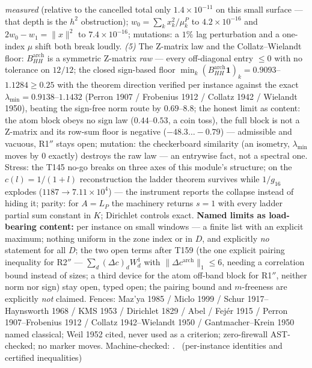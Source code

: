\emph{measured} (relative to the cancelled total only
$1.4\times10^{-11}$ on this small surface --- that depth is the $h^2$
obstruction); $w_0=\sum_kx_k^2/\mu^P_k$ to $4.2\times10^{-16}$ and
$2w_0-w_1=\|x\|^2$ to $7.4\times10^{-16}$; mutations: a $1\%$ lag
perturbation and a one-index $\mu$ shift both break loudly. \emph{(5)}
The Z-matrix law and the Collatz--Wielandt floor:
$B^{\mathrm{arch}}_{HH}$ is a symmetric Z-matrix \emph{raw} --- every
off-diagonal entry $\le0$ with no tolerance on $12/12$; the closed
sign-based floor $\min_k(B^{\mathrm{arch}}_{HH}\mathbf 1)_k=
0.9093$--$1.1284\ge0.25$ with the theorem direction verified per
instance against the exact $\lambda_{\min}=0.9138$--$1.1432$ (Perron
1907 / Frobenius 1912 / Collatz 1942 / Wielandt 1950), beating the
sign-free norm route by $0.69$--$8.8$; the honest limit as content: the
atom block obeys no sign law ($0.44$--$0.53$, a coin toss), the full
block is not a Z-matrix and its row-sum floor is negative
($-48.3\ldots-0.79$) --- admissible and vacuous, R1$''$ stays open;
mutation: the checkerboard similarity (an isometry, $\lambda_{\min}$
moves by $0$ exactly) destroys the raw law --- an entrywise fact, not a
spectral one. Stress: the T145 no-go breaks on three axes of this
module's structure; on the $c(l)=1/(1+l)$ reconstruction the ladder
theorem survives while $1/g_{16}$ explodes ($1187\to7.11\times10^{4}$)
--- the instrument reports the collapse instead of hiding it; parity:
for $A=L_P$ the machinery returns $s=1$ with every ladder partial sum
constant in $K$; Dirichlet controls exact.
\textbf{Named limits as load-bearing content:} per instance on small
windows --- a finite list with an explicit maximum; nothing uniform in
the zone index or in $D$, and explicitly \emph{no} statement for all
$D$; the two open terms after T159 (the one explicit pairing inequality
for R2$''$ --- $\sum_d(\Delta c)_dW^1_d$ with $\|\Delta c^{\mathrm{arch}}
\|_1\le6$, needing a correlation bound instead of sizes; a third device
for the atom off-band block for R1$''$, neither norm nor sign) stay
open, typed open; the pairing bound and $m$-freeness are explicitly
\emph{not} claimed. Fences: Maz'ya 1985 / Miclo 1999 / Schur
1917--Haynsworth 1968 / KMS 1953 / Dirichlet 1829 / Abel / Fej\'er 1915
/ Perron 1907--Frobenius 1912 / Collatz 1942--Wielandt 1950 /
Gantmacher--Krein 1950 named classical; Weil 1952 cited, never used as a
criterion; zero-firewall AST-checked; no marker moves.
Machine-checked: .
\mE\ (per-instance identities and certified inequalities)


